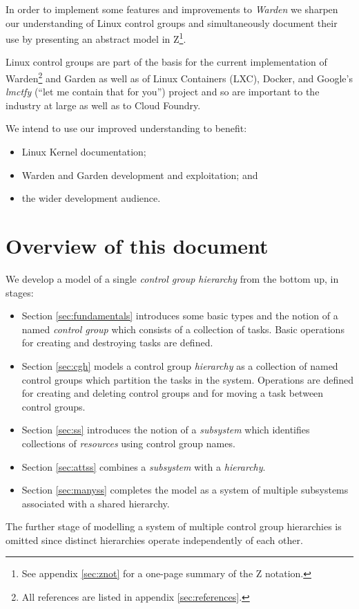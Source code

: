 \documentclass[a4paper,twoside,12pt]{article}
\begin{document}
In order to implement some features and improvements to \emph{Warden} we sharpen our understanding of Linux control groups
and simultaneously document their use by presenting an abstract model in Z\footnote{See appendix \ref{sec:znot} for a one-page summary of the Z notation.}.

Linux control groups are part of the basis for the current implementation of Warden\cite{warden}\footnote{All references are listed in appendix \ref{sec:references}.} and 
Garden\cite{garden} as well as of Linux Containers (LXC), Docker, and Google's
\emph{lmctfy} (``let me contain that for you'') project and so are important to the industry at large as well as to Cloud
Foundry.

We intend to use our improved understanding to benefit:
\begin{itemize}
\item Linux Kernel documentation;
\item Warden\cite{warden} and Garden\cite{garden} development and exploitation; and
\item the wider development audience.
\end{itemize}

\section{Overview of this document}

We develop a model of a single \emph{control group hierarchy} from the bottom up, in stages:
\begin{itemize}

\item Section \ref{sec:fundamentals} introduces some basic types and the notion of a named \emph{control group} which consists of a
collection of tasks. Basic operations for creating and destroying tasks are defined.

\item  Section \ref{sec:cgh} models a control group \emph{hierarchy} as a collection of named control groups which partition the tasks
in the system. Operations are defined for creating and deleting control groups and for moving a task between control groups.

\item Section \ref{sec:ss} introduces the notion of a \emph{subsystem} which identifies collections of \emph{resources} using control group names.

\item Section \ref{sec:attss} combines a \emph{subsystem} with a \emph{hierarchy}.

\item Section \ref{sec:manyss} completes the model as a system of multiple subsystems associated with a shared hierarchy.

\end{itemize}
The further stage of modelling a system of multiple control group hierarchies is omitted since distinct hierarchies operate independently of each other.
\end{document}
